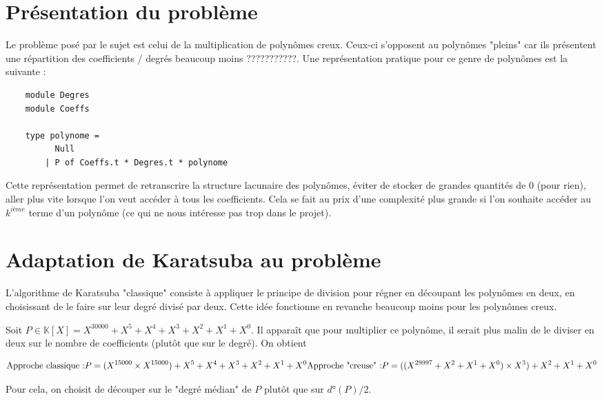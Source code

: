 \section{Présentation du problème}

Le problème posé par le sujet est celui de la multiplication de polynômes creux. Ceux-ci s'opposent au polynômes "pleins" car ils présentent une répartition des coefficients / degrés beaucoup moins ???????????. Une représentation pratique pour ce genre de polynômes est la suivante :

\begin{lstlisting}
	module Degres 
	module Coeffs

	type polynome = 
		  Null
		| P of Coeffs.t * Degres.t * polynome
\end{lstlisting}

Cette représentation permet de retranscrire la structure lacunaire des polynômes, éviter de stocker de grandes quantités de $0$ (pour rien), aller plus vite lorsque l'on veut accéder à tous les coefficients. Cela se fait au prix d'une complexité plus grande si l'on souhaite accéder au $k^{ième}$ terme d'un polynôme (ce qui ne nous intéresse pas trop dans le projet).

\section{Adaptation de Karatsuba au problème}

L'algorithme de Karatsuba "classique" consiste à appliquer le principe de division pour régner en découpant les polynômes en deux, en choisissant de le faire sur leur degré divisé par deux. Cette idée fonctionne en revanche beaucoup moins pour les polynômes creux. 

Soit $P \in \mathbb{K}[X] = X^30000 + X^5 + X^4 + X^3 + X^2 + X^1 + X^0$. Il apparaît que pour multiplier ce polynôme, il serait plus malin de le diviser en deux sur le nombre de coefficients (plutôt que sur le degré). On obtient 

\begin{equation}
	\text{Approche classique :} P = (X^{15000} \times X^{15000}) + X^5 + X^4 + X^3 + X^2 + X^1 + X^0 \\
	\text{Approche "creuse" :} P = ((X^{29997} + X^2 + X^1 + X^0) \times X^3) + X^2 + X^1 + X^0 
\end{equation}

Pour cela, on choisit de découper sur le "degré médian" de $P$ plutôt que sur $d°(P) / 2$.

